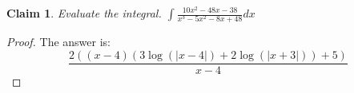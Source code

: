 \documentclass{article}
\newtheorem{theorem}{Claim}
\begin{document}
\begin{theorem}
Evaluate the integral.
$ \int \frac{10x^2-48x-38}{x^3-5x^2-8x+48} dx $
\end{theorem}

\begin{proof}
The answer is:
\[
\frac{2 \left(\left(x - 4\right) \left(3 \log{\left(\left|{x - 4}\right| \right)} + 2 \log{\left(\left|{x + 3}\right| \right)}\right) + 5\right)}{x - 4}
\]
\end{proof}
\end{document}
